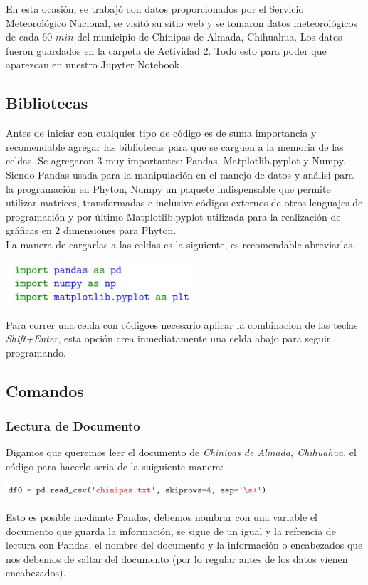 \documentclass[12pt]{article}
\begin{document}
En esta ocasión, se trabajó con datos proporcionados por el Servicio Meteorológico Nacional, se visitó su sitio web y se tomaron datos meteorológicos de cada $60$ $min$ del municipio de Chínipas de Almada, Chihuahua. Los datos fueron guardados en la carpeta de Actividad 2. Todo esto para poder que aparezcan en nuestro Jupyter Notebook.

\subsection{Bibliotecas}
Antes de iniciar con cualquier tipo de código es de suma importancia y recomendable agregar las bibliotecas para que se carguen a la memoria de las celdas. Se agregaron 3 muy importantes: Pandas, Matplotlib.pyplot y Numpy. Siendo Pandas usada para la manipulación en el manejo de datos y análisi para la programación en Phyton, Numpy un paquete indispensable que permite utilizar matrices, transformadas e inclusive códigos externos de otros lenguajes de programación y por último Matplotlib.pyplot utilizada para la realización de gráficas en 2 dimensiones para Phyton.\\

La manera de cargarlas a las celdas es la siguiente, es recomendable abreviarlas.
\begin{center}
	\includegraphics[height=1.6cm]{bib.jpg}
\end{center}
Para correr una celda con códigoes necesario aplicar la combinacion de las teclas \textit{Shift+Enter}, esta opción crea inmediatamente una celda abajo para seguir programando.

\subsection{Comandos}
\subsubsection{Lectura de Documento}
Digamos que queremos leer el documento de \textit{Chínipas de Almada, Chihuahua}, el código para hacerlo seria de la suiguiente manera:\\

\begin{center}
	\includegraphics[height=0.5cm]{leer.jpg}
\end{center}
 Esto es posible mediante Pandas, debemos nombrar con una variable el documento que guarda la información, se sigue de un igual y la refrencia de lectura con Pandas, el nombre del documento y la información o encabezados que nos debemos de saltar del documento (por lo regular antes de los datos vienen encabezados).\\
 
\end{document}
